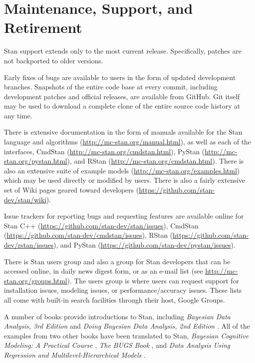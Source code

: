 \section{Maintenance, Support, and Retirement}

Stan support extends only to the most current release. Specifically,
patches are not backported to older versions.  

Early fixes of bugs are available to users in the form of updated
development branches. Snapshots of the entire code base at every
commit, including development patches and official releases, are
available from GitHub.  Git itself may be used to download a complete
clone of the entire source code history at any time.

There is extensive documentation in the form of manuals available for
the Stan language and algorithms
(\url{http://mc-stan.org/manual.html}), as well as each of the
interfaces, CmdStan (\url{http://mc-stan.org/cmdstan.html}), PyStan
(\url{http://mc-stan.org/pystan.html}), and RStan
(\url{http://mc-stan.org/cmdstan.html}). There is also an extensive
suite of example models (\url{http://mc-stan.org/examples.html}) which
may be used directly or modified by users. There is also a fairly
extensive set of Wiki pages geared toward developers
(\url{https://github.com/stan-dev/stan/wiki}).

Issue trackers for reporting bugs and requesting features are
available online for Stan C++
(\url{https://github.com/stan-dev/stan/issues}), CmdStan
(\url{https://github.com/stan-dev/cmdstan/issues}), RStan
(\url{https://github.com/stan-dev/rstan/issues}), and PyStan
(\url{https://github.com/stan-dev/pystan/issues}).

There is Stan users group and also a group for Stan developers that
can be accessed online, in daily news digest form, or as an e-mail
list (see \url{http://mc-stan.org/groups.html}).  The users group is
where users can request support for installation issues, modeling
issues, or performance/accuracy issues.  These lists all come with
built-in search facilities through their host, Google Groups.

A number of books provide introductions to Stan, including {\it
  Bayesian Data Analysis, 3rd Edition} \citep{GelmanEtAl:2013} and
{\it Doing Bayesian Data Analysis, 2nd Edition} \citep{Kruschke:2014}.
All of the examples from two other books have been translated to
Stan, {\it Bayesian Cognitive Modeling: A Practical Course}
\citep{LeeWagenmakers:2013}, {\it The BUGS Book}
\citep{LunnEtAl:2012}, and {\it Data Analysis Using Regression and
  Multilevel-Hierarchical Models} \citep{GelmanHill:2007}.

